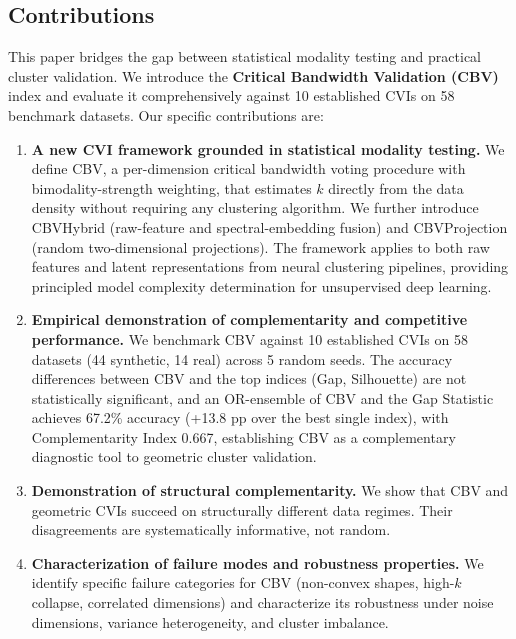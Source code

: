 \documentclass[journal]{IEEEtran}
\begin{document}
\subsection{Contributions}
\label{sec:contributions}

This paper bridges the gap between statistical modality testing and practical cluster validation. We introduce the \textbf{Critical Bandwidth Validation (CBV)} index and evaluate it comprehensively against 10 established CVIs on 58 benchmark datasets. Our specific contributions are:

\begin{enumerate}
    \item \textbf{A new CVI framework grounded in statistical modality testing.} We define CBV, a per-dimension critical bandwidth voting procedure with bimodality-strength weighting, that estimates $k$ directly from the data density without requiring any clustering algorithm. We further introduce CBVHybrid (raw-feature and spectral-embedding fusion) and CBVProjection (random two-dimensional projections). The framework applies to both raw features and latent representations from neural clustering pipelines, providing principled model complexity determination for unsupervised deep learning.

    \item \textbf{Empirical demonstration of complementarity and competitive performance.} We benchmark CBV against 10 established CVIs on 58 datasets (44 synthetic, 14 real) across 5 random seeds. The accuracy differences between CBV and the top indices (Gap, Silhouette) are not statistically significant, and an OR-ensemble of CBV and the Gap Statistic achieves 67.2\% accuracy (+13.8 pp over the best single index), with Complementarity Index 0.667, establishing CBV as a complementary diagnostic tool to geometric cluster validation.

    \item \textbf{Demonstration of structural complementarity.} We show that CBV and geometric CVIs succeed on structurally different data regimes. Their disagreements are systematically informative, not random.

    \item \textbf{Characterization of failure modes and robustness properties.} We identify specific failure categories for CBV (non-convex shapes, high-$k$ collapse, correlated dimensions) and characterize its robustness under noise dimensions, variance heterogeneity, and cluster imbalance.
\end{enumerate}
\end{document}
